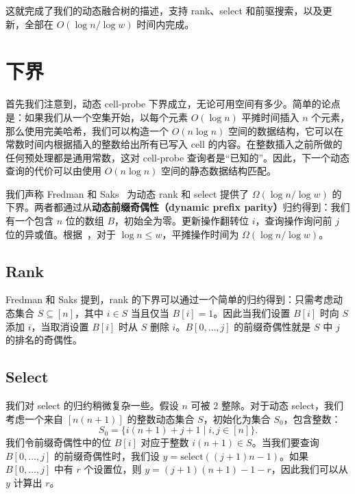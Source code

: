 \documentclass[11pt,a4paper]{ctexart}
\newcommand{\SELECT}{\text{select}}
\begin{document}
这就完成了我们的动态融合树的描述，支持 rank、select 和前驱搜索，以及更新，全部在 $O(\log n/\log w)$ 时间内完成。

\section{下界}\label{sec:lower}

首先我们注意到，动态 cell-probe 下界成立，无论可用空间有多少。简单的论点是：如果我们从一个空集开始，以每个元素 $O(\log n)$ 平摊时间插入 $n$ 个元素，那么使用完美哈希，我们可以构造一个 $O(n\log n)$ 空间的数据结构，它可以在常数时间内根据插入的整数给出所有已写入 cell 的内容。在整数插入之前所做的任何预处理都是通用常数，这对 cell-probe 查询者是``已知的''。因此，下一个动态查询的代价可以由使用 $O(n \log n)$ 空间的静态数据结构匹配。

我们声称 Fredman 和 Saks~\cite{fredman89cellprobe} 为动态 rank 和 select 提供了 $\Omega(\log n/\log w)$ 的下界。两者都通过从\textbf{动态前缀奇偶性（dynamic prefix parity）}归约得到：我们有一个包含 $n$ 位的数组 $B$，初始全为零。更新操作翻转位 $i$，查询操作询问前 $j$ 位的异或值。根据~\cite[Theorem 3]{fredman89cellprobe}，对于 $\log n \leq w$，平摊操作时间为 $\Omega(\log n/\log w)$。

\subsection{Rank}

Fredman 和 Saks 提到，rank 的下界可以通过一个简单的归约得到：只需考虑动态集合 $S \subseteq [n]$，其中 $i \in S$ 当且仅当 $B[i] = 1$。因此当我们设置 $B[i]$ 时向 $S$ 添加 $i$，当取消设置 $B[i]$ 时从 $S$ 删除 $i$。$B[0, \dots, j]$ 的前缀奇偶性就是 $S$ 中 $j$ 的排名的奇偶性。

\subsection{Select}

我们对 select 的归约稍微复杂一些。假设 $n$ 可被 $2$ 整除。对于动态 select，我们考虑一个来自 $[n(n+1)]$ 的整数动态集合 $S$，初始化为集合 $S_0$，包含整数：
\[
S_0 = \{i(n+1) + j + 1 \mid i, j \in [n]\}.
\]
我们令前缀奇偶性中的位 $B[i]$ 对应于整数 $i(n+1) \in S$。当我们要查询 $B[0, \dots, j]$ 的前缀奇偶性时，我们设 $y = \SELECT((j+1)n - 1)$。如果 $B[0, \dots, j]$ 中有 $r$ 个设置位，则 $y = (j+1)(n+1) - 1 - r$，因此我们可以从 $y$ 计算出 $r$。
\end{document}
